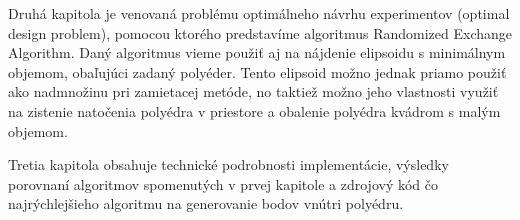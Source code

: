Druhá kapitola je venovaná problému optimálneho návrhu experimentov (optimal design problem), pomocou ktorého predstavíme algoritmus Randomized Exchange Algorithm. Daný algoritmus vieme použiť aj na nájdenie elipsoidu s minimálnym objemom, obaľujúci zadaný polyéder. Tento elipsoid možno jednak priamo použiť ako nadmnožinu pri zamietacej metóde, no taktiež možno jeho vlastnosti využiť na zistenie natočenia polyédra v priestore a obalenie polyédra kvádrom s malým objemom.

Tretia kapitola obsahuje technické podrobnosti implementácie, výsledky porovnaní algoritmov spomenutých v prvej kapitole a zdrojový kód čo najrýchlejšieho algoritmu na generovanie bodov vnútri polyédru.